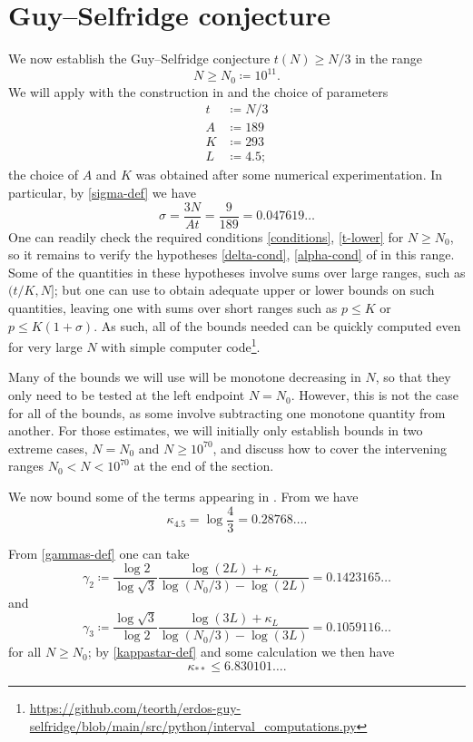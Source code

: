 \documentclass[12pt,a4paper,reqno]{amsart}
\numberwithin{equation}{section}
\theoremstyle{plain}
\theoremstyle{definition}
\begin{document}
\section{Guy--Selfridge conjecture}

We now establish the Guy--Selfridge conjecture $t(N) \geq N/3$ in the range
$$ N \geq N_0 \coloneqq 10^{11}.$$
We will apply  with the construction in  and the choice of parameters
\begin{align*}
  t &\coloneqq N/3\\
  A &\coloneqq 189\\
  K &\coloneqq 293 \\
  L &\coloneqq 4.5;
\end{align*}
the choice of $A$ and $K$ was obtained after some numerical experimentation.  In particular, by \eqref{sigma-def} we have
$$ \sigma = \frac{3N}{At}=\frac{9}{189} =0.047619\dots$$
One can readily check the required conditions \eqref{conditions}, \eqref{t-lower} for $N \geq N_0$, so it remains to verify the hypotheses \eqref{delta-cond}, \eqref{alpha-cond} of  in this range.  Some of the quantities in these hypotheses involve sums over large ranges, such as $(t/K,N]$; but one can use  to obtain adequate upper or lower bounds on such quantities, leaving one with sums over short ranges such as $p \leq K$ or $p \leq K(1+\sigma)$.  As such, all of the bounds needed can be quickly computed even for very large $N$ with simple computer code\footnote{\url{https://github.com/teorth/erdos-guy-selfridge/blob/main/src/python/interval_computations.py}}.

Many of the bounds we will use will be monotone decreasing in $N$, so that they only need to be tested at the left endpoint $N=N_0$.  However, this is not the case for all of the bounds, as some involve subtracting one monotone quantity from another.  For those estimates, we will initially only establish bounds in two extreme cases, $N=N_0$ and $N \geq 10^{70}$, and discuss how to cover the intervening ranges $N_0 < N < 10^{70}$ at the end of the section.
  
We now bound some of the terms appearing in . From  we have
$$ \kappa_{4.5} = \log \frac{4}{3} =0.28768\dots.$$

From \eqref{gammas-def} one can take
$$ \gamma_2 \coloneqq \frac{\log 2}{\log \sqrt{3}} \frac{\log(2L) + \kappa_L}{\log(N_0/3) - \log(2L)} = 0.1423165\dots$$
and
$$\gamma_3 \coloneqq \frac{\log \sqrt{3}}{\log 2} \frac{\log(3L) + \kappa_L}{\log(N_0/3) - \log(3L)} =  0.1059116 \dots$$
for all $N \geq N_0$; by \eqref{kappastar-def} and some calculation we then have
$$ \kappa_{**} \leq 6.830101\dots.$$
\end{document}
